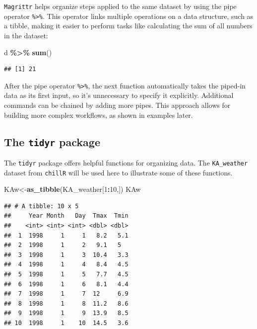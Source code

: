 \documentclass[
]{article}
\newenvironment{Shaded}{\begin{snugshade}}{\end{snugshade}}
\newcommand{\DecValTok}[1]{\textcolor[rgb]{0.00,0.00,0.81}{#1}}
\newcommand{\FunctionTok}[1]{\textcolor[rgb]{0.13,0.29,0.53}{\textbf{#1}}}
\newcommand{\NormalTok}[1]{#1}
\newcommand{\OtherTok}[1]{\textcolor[rgb]{0.56,0.35,0.01}{#1}}
\newcommand{\SpecialCharTok}[1]{\textcolor[rgb]{0.81,0.36,0.00}{\textbf{#1}}}
\begin{document}
\texttt{Magrittr} helps organize steps applied to the same dataset by using the pipe operator \texttt{\%\textgreater{}\%}. This operator links multiple operations on a data structure, such as a tibble, making it easier to perform tasks like calculating the sum of all numbers in the dataset:

\begin{Shaded}
\begin{Highlighting}[]
\NormalTok{d }\SpecialCharTok{\%\textgreater{}\%} \FunctionTok{sum}\NormalTok{()}
\end{Highlighting}
\end{Shaded}

\begin{verbatim}
## [1] 21
\end{verbatim}

After the pipe operator \texttt{\%\textgreater{}\%}, the next function automatically takes the piped-in data as its first input, so it's unnecessary to specify it explicitly. Additional commands can be chained by adding more pipes. This approach allows for building more complex workflows, as shown in examples later.

\subsection{\texorpdfstring{The \texttt{tidyr} package}{The tidyr package}}\label{the-tidyr-package}

The \texttt{tidyr} package offers helpful functions for organizing data. The \texttt{KA\_weather} dataset from \texttt{chillR} will be used here to illustrate some of these functions.

\begin{Shaded}
\begin{Highlighting}[]
\NormalTok{KAw}\OtherTok{\textless{}{-}}\FunctionTok{as\_tibble}\NormalTok{(KA\_weather[}\DecValTok{1}\SpecialCharTok{:}\DecValTok{10}\NormalTok{,])}
\NormalTok{KAw}
\end{Highlighting}
\end{Shaded}

\begin{verbatim}
## # A tibble: 10 x 5
##     Year Month   Day  Tmax  Tmin
##    <int> <int> <int> <dbl> <dbl>
##  1  1998     1     1   8.2   5.1
##  2  1998     1     2   9.1   5  
##  3  1998     1     3  10.4   3.3
##  4  1998     1     4   8.4   4.5
##  5  1998     1     5   7.7   4.5
##  6  1998     1     6   8.1   4.4
##  7  1998     1     7  12     6.9
##  8  1998     1     8  11.2   8.6
##  9  1998     1     9  13.9   8.5
## 10  1998     1    10  14.5   3.6
\end{verbatim}
\end{document}
